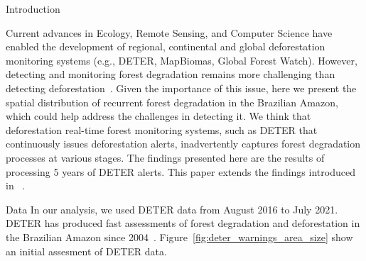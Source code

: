 \documentclass[20pt]{beamer}
\begin{document}
\vspace*{-2cm}
\begin{frame}[fragile,t]
\begin{columns}[t]




\begin{column}{0.33\linewidth}

\vspace{1cm}

    \begin{block}{Introduction\vphantom{g}}

Current advances in Ecology, Remote Sensing, and Computer Science have enabled the development of regional, continental and global deforestation monitoring systems (e.g., DETER, MapBiomas, Global Forest Watch).
However, detecting and monitoring forest degradation remains more challenging than detecting deforestation~\cite{Lambin:1999,Mitchell2017}.
Given the importance of this issue, here we present the spatial distribution of recurrent forest degradation in the Brazilian Amazon, which could help address the challenges in detecting it. 
We think that deforestation real-time forest monitoring systems, such as DETER that continuously issues deforestation alerts, inadvertently captures forest degradation processes at various stages.
The findings presented here are the results of processing 5 years of DETER alerts.
This paper extends the findings introduced in ~\cite{sanchez2023}.

    \end{block}

\vspace{1cm}

    \begin{block}{Data}
In our analysis, we used DETER data from August 2016 to July 2021.
DETER has produced fast assessments of forest degradation and deforestation in the Brazilian Amazon since 2004~\cite{shimabukuro2006}. 
Figure~\ref{fig:deter_warnings_area_size} show an initial assesment of DETER data.


\end{block}
\end{column}
\end{columns}
\end{frame}
\end{document}
